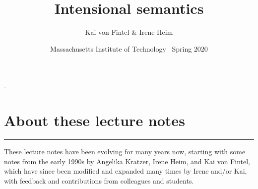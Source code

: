 \frontmatter

\title{Intensional semantics}
\author{Kai von Fintel \& Irene Heim}
\date{Massachusetts Institute of Technology \textbullet\ Spring 2020}

\pagestyle{empty}

\begin{titlingpage}
  \calccentering\unitlength %
  \begin{adjustwidth}{\unitlength}{-\unitlength}
    \par
    \vfill
    \begin{center}
      {\HUGE \thetitle}\par
      \vspace{4\baselineskip}
      {\LARGE\MakeUppercase{\theauthor}}\par
    \end{center}
  \end{adjustwidth} 
\end{titlingpage}
\cleardoublepage

\pagestyle{empty}
\titleVDQI

\clearpage
\vspace*{\fill}
\section*{About these lecture notes}

\plainbreak{1} 

These lecture notes have been evolving for many years now, starting with some
notes from the early 1990s by Angelika Kratzer, Irene Heim, and Kai von Fintel,
which have since been modified and expanded many times by Irene and/or Kai, with
feedback and contributions from colleagues and students.

